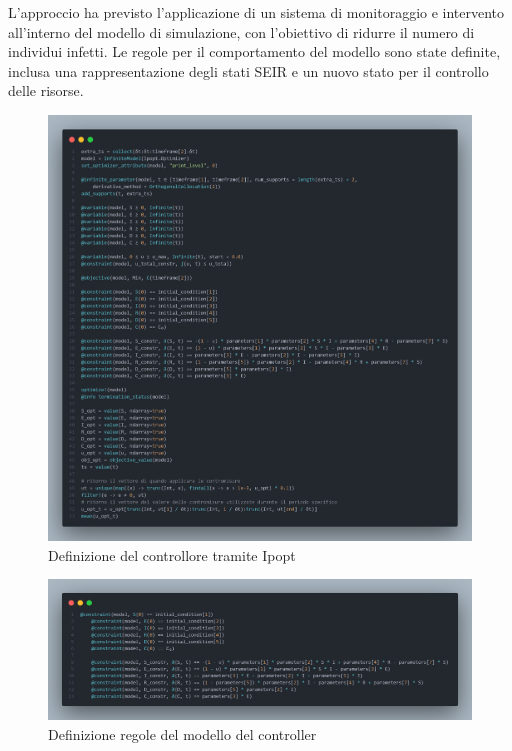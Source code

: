 L'approccio ha previsto l'applicazione di un sistema di 
monitoraggio e intervento all'interno del modello di simulazione, 
con l'obiettivo di ridurre il numero di individui infetti. 
Le regole per il comportamento del modello sono state definite, 
inclusa una rappresentazione degli stati SEIR e un nuovo stato per 
il controllo delle risorse.

\begin{figure}[H]
	\begin{center}
		\includegraphics[width=\textwidth]{img/controller_ipopt.png}
		\caption{Definizione del controllore tramite Ipopt}
		\label{fig:controller_ipopt}	
    \end{center}
\end{figure}

\begin{figure}[H]
	\begin{center}
		\includegraphics[width=\textwidth]{img/controller_rules.png}
		\caption{Definizione regole del modello del controller}
		\label{fig:controller_rules}	
    \end{center}
\end{figure}

